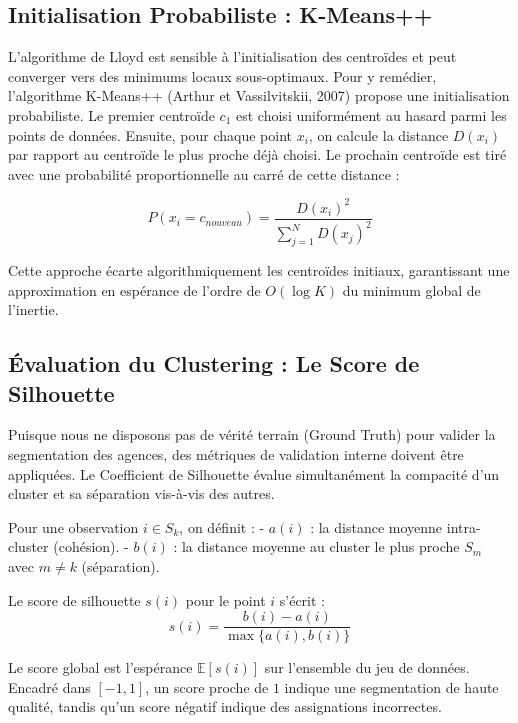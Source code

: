 \documentclass[11pt,a4paper,twoside]{report}
\begin{document}
\subsection{Initialisation Probabiliste : K-Means++}

L'algorithme de Lloyd est sensible à l'initialisation des centroïdes et peut converger vers des minimums locaux sous-optimaux. Pour y remédier, l'algorithme K-Means++ (Arthur et Vassilvitskii, 2007) propose une initialisation probabiliste. Le premier centroïde $c_1$ est choisi uniformément au hasard parmi les points de données. Ensuite, pour chaque point $x_i$, on calcule la distance $D(x_i)$ par rapport au centroïde le plus proche déjà choisi. Le prochain centroïde est tiré avec une probabilité proportionnelle au carré de cette distance :

\begin{equation}
P(x_i = c_{nouveau}) = \frac{D(x_i)^2}{\sum_{j=1}^{N} D(x_j)^2}
\end{equation}

Cette approche écarte algorithmiquement les centroïdes initiaux, garantissant une approximation en espérance de l'ordre de $O(\log K)$ du minimum global de l'inertie.

\subsection{Évaluation du Clustering : Le Score de Silhouette}

Puisque nous ne disposons pas de vérité terrain (Ground Truth) pour valider la segmentation des agences, des métriques de validation interne doivent être appliquées. Le Coefficient de Silhouette évalue simultanément la compacité d'un cluster et sa séparation vis-à-vis des autres.

Pour une observation $i \in S_k$, on définit :
- $a(i)$ : la distance moyenne intra-cluster (cohésion).
- $b(i)$ : la distance moyenne au cluster le plus proche $S_m$ avec $m \neq k$ (séparation).

Le score de silhouette $s(i)$ pour le point $i$ s'écrit :
\begin{equation}
s(i) = \frac{b(i) - a(i)}{\max\{a(i), b(i)\}}
\end{equation}

Le score global est l'espérance $\mathbb{E}[s(i)]$ sur l'ensemble du jeu de données. Encadré dans $[-1, 1]$, un score proche de $1$ indique une segmentation de haute qualité, tandis qu'un score négatif indique des assignations incorrectes.
\end{document}
